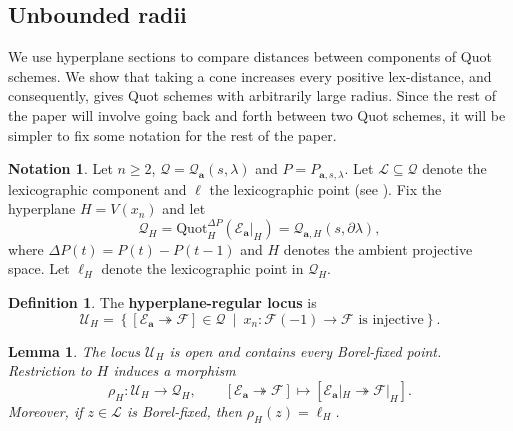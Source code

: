 \documentclass[leqno,11pt,a4paper]{amsart}
\newtheorem{lemma}[lemma]{Lemma}
\theoremstyle{definition}
\newtheorem{notation}[notation]{Notation}
\newtheorem{definition}[definition]{Definition}
\numberwithin{equation}{section}
\newcommand{\bfa}{\mathbf{a}}
\newcommand{\Quot}{\mathrm{Quot}}
\newcommand{\EE}{\mathscr{E}}
\newcommand{\FF}{\mathscr{F}}
\newcommand{\LL}{\mathcal{L}}
\newcommand{\QQ}{\mathcal{Q}}
\newcommand{\UU}{\mathcal{U}}
\begin{document}
\subsection{Unbounded radii}
We use hyperplane sections to compare distances between components of Quot schemes. 
We show that taking a cone increases every positive lex-distance, and consequently, gives Quot schemes with arbitrarily large radius. 
Since the rest of the paper will involve going back and forth between two Quot schemes, it will be simpler to fix some notation for the rest of the paper.

\begin{notation}
Let $n\geq2$, $\QQ=\QQ_{\bfa}(s,\lambda)$ and $P=P_{\bfa,s,\lambda}$.
Let $\LL\subseteq\QQ$ denote the lexicographic component and $\ell$ the lexicographic point (see ).
Fix the hyperplane $H=V(x_n)$ and let 
$$
\QQ_H=
\Quot_H^{\Delta P}(\EE_{\bfa}|_H)
=\QQ_{\bfa,H}(s,\partial\lambda),
$$
where $\Delta P(t)=P(t)-P(t-1)$ and $H$ denotes the ambient projective space. Let $\ell_H$ denote the lexicographic point in $\QQ_H$.
\end{notation}

\begin{definition}\label{def:hyperplane-regular-locus}
The \textbf{hyperplane-regular locus} is
$$
\UU_H=
\left\{ [\EE_{\bfa}\twoheadrightarrow\FF]\in\QQ \ \middle|\ x_n:\FF(-1) \to \FF \text{ is injective} \right\}.
$$
\end{definition}

\begin{lemma}\label{lem:hyperplane-slicing}
The locus $\UU_H$ is open and contains every Borel-fixed point.
Restriction to $H$ induces a morphism
$$
\rho_H:\UU_H\longrightarrow\QQ_H,
\qquad [\EE_{\bfa}\twoheadrightarrow\FF] \mapsto [\EE_{\bfa}|_H\twoheadrightarrow\FF|_H].
$$
Moreover, if $z\in\LL$ is Borel-fixed, then $\rho_H(z)=\ell_H$.
\end{lemma}
\end{document}
